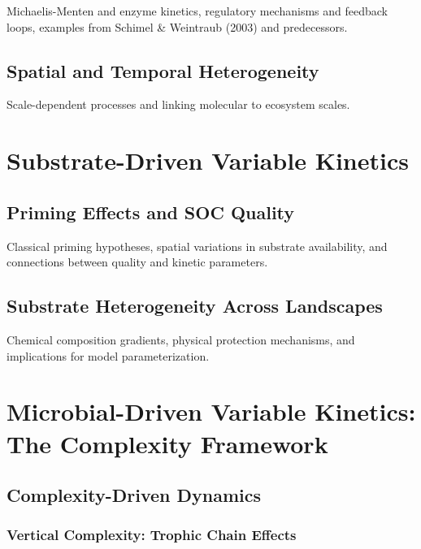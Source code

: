 \documentclass[12pt,a4paper]{article}
\begin{document}
Michaelis-Menten and enzyme kinetics, regulatory mechanisms and feedback loops, examples from Schimel \& Weintraub (2003) and predecessors.

\subsection{Spatial and Temporal Heterogeneity} \label{sec:theory_heterogeneity}

Scale-dependent processes and linking molecular to ecosystem scales.


\section{Substrate-Driven Variable Kinetics} \label{sec:substrate}

\subsection{Priming Effects and SOC Quality} \label{sec:substrate_priming}

Classical priming hypotheses, spatial variations in substrate availability, and connections between quality and kinetic parameters.

\subsection{Substrate Heterogeneity Across Landscapes} \label{sec:substrate_landscape}

Chemical composition gradients, physical protection mechanisms, and implications for model parameterization.




\section{Microbial-Driven Variable Kinetics: The Complexity Framework} \label{sec:microbial}


\subsection{Complexity-Driven Dynamics} \label{sec:microbial_complexity}


\subsubsection{Vertical Complexity: Trophic Chain Effects} \label{sec:microbial_vertical}
\end{document}
